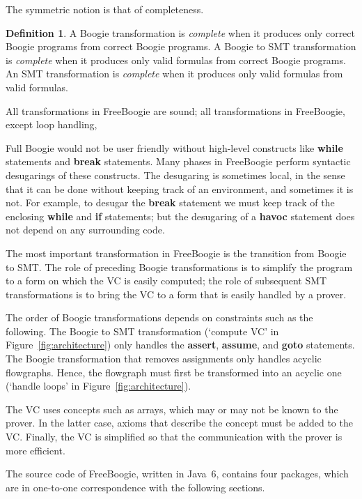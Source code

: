 \documentclass[a4paper]{article}
\theoremstyle{slanted}
\theoremstyle{definition}
\newtheorem{definition}{Definition}
\theoremstyle{remark}
\begin{document}
The symmetric notion is that of completeness.

\begin{definition}
A Boogie transformation is \emph{complete} when it produces
only correct Boogie programs from correct Boogie programs. A
Boogie to SMT transformation is \emph{complete} when it produces
only valid formulas from correct Boogie programs. An SMT
transformation is \emph{complete} when it produces only valid
formulas from valid formulas.
\label{def:complete-transform}
\end{definition}

All transformations in FreeBoogie are sound; all transformations
in FreeBoogie, except loop handling,

Full Boogie would not be user friendly without high-level
constructs like \textbf{while} statements and \textbf{break}
statements. Many phases in FreeBoogie perform syntactic
desugarings of these constructs. The desugaring is sometimes
local, in the sense that it can be done without keeping track of
an environment, and sometimes it is not. For example, to desugar
the \textbf{break} statement we must keep track of the enclosing
\textbf{while} and \textbf{if} statements; but the desugaring of
a \textbf{havoc} statement does not depend on any surrounding
code.

The most important transformation in FreeBoogie is the
transition from Boogie to SMT\null. The role of preceding Boogie
transformations is to simplify the program to a form on which the
VC is easily computed; the role of subsequent SMT transformations
is to bring the VC to a form that is easily handled by a prover.

The order of Boogie transformations depends on constraints
such as the following. The Boogie to SMT transformation
(`compute VC' in Figure~\ref{fig:architecture}) only handles
the \textbf{assert}, \textbf{assume}, and \textbf{goto}
statements. The Boogie transformation that removes assignments
only handles acyclic flowgraphs. Hence, the flowgraph must
first be transformed into an acyclic one (`handle loops' in
Figure~\ref{fig:architecture}).

The VC uses concepts such as arrays, which may or may not be
known to the prover. In the latter case, axioms that describe
the concept must be added to the VC\null. Finally, the VC is
simplified so that the communication with the prover is
more efficient.

The source code of FreeBoogie, written in Java~6, contains
four packages, which are in one-to-one correspondence with the
following sections.
\end{document}

